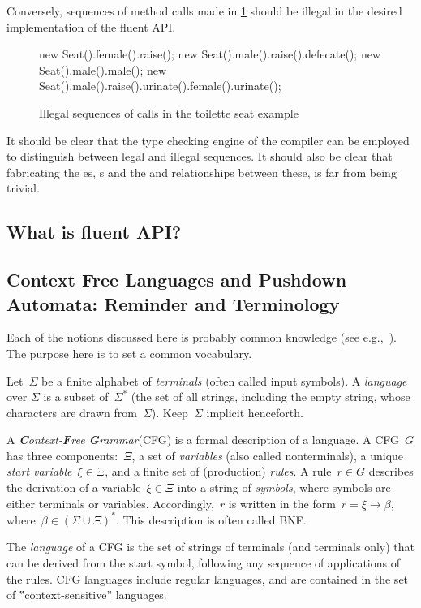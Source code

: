 Conversely, sequences of method calls made in \cref{Figure:toilette:illegal}
  should be illegal in the desired implementation of the fluent API.

\begin{figure}[htbp]
  \begin{JAVA}
new Seat().female().raise();
new Seat().male().raise().defecate();
new Seat().male().male();
new Seat().male().raise().urinate().female().urinate();\end{JAVA}
  \caption{Illegal sequences of calls in the toilette seat example}
  \label{Figure:toilette:illegal}
\end{figure}
It should be clear that the type checking engine of the compiler can
be employed to distinguish between legal and illegal sequences.
It should also be clear that fabricating the es, s
and the  and  relationships between these, is
far from being trivial.

\subsection{What is fluent API?}

\subsection{Context Free Languages and Pushdown Automata: Reminder and Terminology}
Each of the notions discussed here is probably common knowledge
(see e.g.,~\cite{Hopcroft:book:2001,must be others}).
The purpose here is to set a common vocabulary. 

Let~$Σ$ be a finite alphabet of \emph{terminals} (often called input symbols).
A \emph{language} over $Σ$
  is a subset of~$Σ^*$ (the set of all strings, including the empty string,
whose characters are drawn from~$Σ$).
Keep~$Σ$ implicit henceforth.

A \emph{\textbf Context-\textbf Free \textbf Grammar}(CFG) is a formal description of a language.
A CFG~$G$ has three components:~$Ξ$,
a set of \emph{variables} (also called nonterminals), a unique \emph{start variable}~$ξ∈Ξ$, and
  a finite set of (production) \emph{rules}.
A rule~$r∈G$ describes the derivation of a variable~$ξ∈Ξ$ into
  a string of \emph{symbols}, where symbols are either terminals or variables.
Accordingly,~$r$ is written in the form~$r=ξ→β$, where~$β∈\left(Σ∪Ξ\right)^*$.
This description is often called BNF.

The \emph{language} of a CFG is the set of strings of terminals (and terminals only)
  that can be derived from the start symbol, following any sequence of applications of the rules.
CFG languages include regular languages, and are contained in the set
  of ‟context-sensitive” languages.

